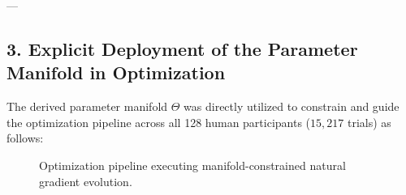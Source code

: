 \documentclass[11pt,twoside,a4paper]{article}
\begin{document}
---

\subsection{3. Explicit Deployment of the Parameter Manifold in Optimization}

The derived parameter manifold $\Theta$ was directly utilized to constrain and guide the optimization pipeline across all 128 human participants ($15,217$ trials) as follows:

\begin{figure}[H]
\centering
{}
\caption{Optimization pipeline executing manifold-constrained natural gradient evolution.}
\label{fig:opt_flow}
\end{figure}
\end{document}
